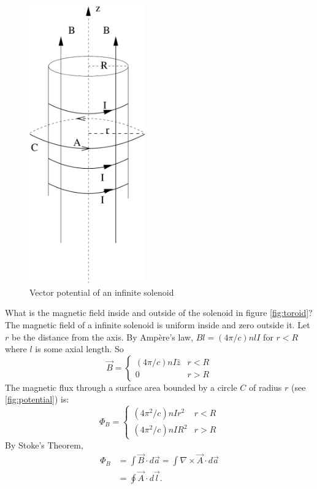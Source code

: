\documentclass[makesolutionspdf]{esg8022pset}
\begin{document}
\begin{solution}
 
  \begin{figure}[H]
    \centering
    \includegraphics[width = 5cm]{vecpot7}  
    \caption{Vector potential of an infinite solenoid}
    \label{fig:potential}
  \end{figure}
   What is the magnetic field inside and outside of the solenoid in figure \autoref{fig:toroid}?
  The magnetic field of a infinite solenoid is uniform inside and zero outside
  it.  Let $r$ be the distance from the axis.
  By Amp\`{e}re's law, $Bl=(4\pi/c)nlI$ for $r<R$ where $l$ is some axial
  length.  So
  \begin{equation}
    \vec{B}= \begin{cases} (4\pi/c)nI\hat{z} & r<R\\0 & r>R \end{cases}
  \end{equation}
  The  magnetic flux through a surface area bounded by a circle $C$ of radius
  $r$ (see \autoref{fig:potential}) is:
  \begin{equation}
    \Phi_B = \begin{cases} (4\pi^2/c)nIr^2 & r<R\\ (4\pi^2/c)nIR^2 & r>R \end{cases}
  \end{equation}
  By Stoke's Theorem,
  \begin{align*}
    \Phi_B & = \int \vec{B}\cdot d\vec{a}=\int \nabla\times\vec{A}\cdot d\vec{a}\\
           & = \oint \vec{A}\cdot d\vec{l}.
  \end{align*}


\end{solution}
\end{document}
